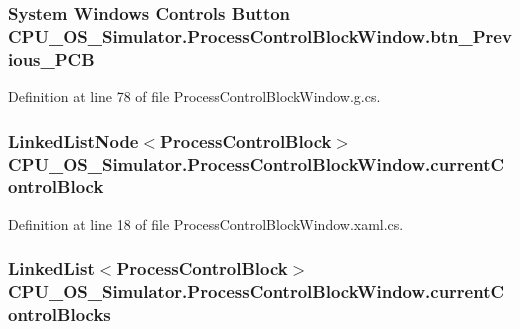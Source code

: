 \subsubsection[{btn\+\_\+\+Previous\+\_\+\+P\+C\+B}]{\setlength{\rightskip}{0pt plus 5cm}System Windows Controls Button C\+P\+U\+\_\+\+O\+S\+\_\+\+Simulator.\+Process\+Control\+Block\+Window.\+btn\+\_\+\+Previous\+\_\+\+P\+C\+B\hspace{0.3cm}{\ttfamily [package]}}\label{class_c_p_u___o_s___simulator_1_1_process_control_block_window_af25ab71dad636514e08f3e8839b04727}


Definition at line 78 of file Process\+Control\+Block\+Window.\+g.\+cs.

\hypertarget{class_c_p_u___o_s___simulator_1_1_process_control_block_window_a6019633d26586b0df1c4c2d6f008f6c9}{}
\subsubsection[{current\+Control\+Block}]{\setlength{\rightskip}{0pt plus 5cm}Linked\+List\+Node$<${\bf Process\+Control\+Block}$>$ C\+P\+U\+\_\+\+O\+S\+\_\+\+Simulator.\+Process\+Control\+Block\+Window.\+current\+Control\+Block\hspace{0.3cm}{\ttfamily [private]}}\label{class_c_p_u___o_s___simulator_1_1_process_control_block_window_a6019633d26586b0df1c4c2d6f008f6c9}


Definition at line 18 of file Process\+Control\+Block\+Window.\+xaml.\+cs.

\hypertarget{class_c_p_u___o_s___simulator_1_1_process_control_block_window_a1cc81320d60155abc2d1fd7370aeeb9a}{}
\subsubsection[{current\+Control\+Blocks}]{\setlength{\rightskip}{0pt plus 5cm}Linked\+List$<${\bf Process\+Control\+Block}$>$ C\+P\+U\+\_\+\+O\+S\+\_\+\+Simulator.\+Process\+Control\+Block\+Window.\+current\+Control\+Blocks\hspace{0.3cm}{\ttfamily [private]}}\label{class_c_p_u___o_s___simulator_1_1_process_control_block_window_a1cc81320d60155abc2d1fd7370aeeb9a}


